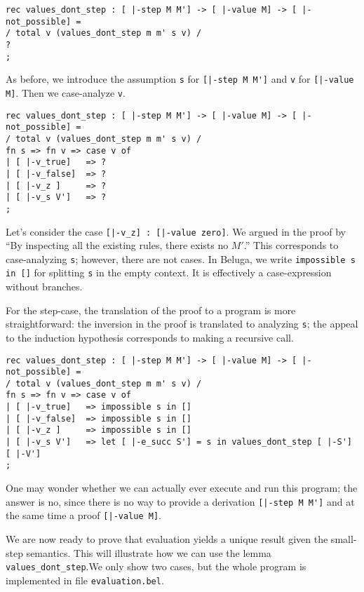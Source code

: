 \begin{lstlisting}
rec values_dont_step : [ |-step M M'] -> [ |-value M] -> [ |-not_possible] =
/ total v (values_dont_step m m' s v) /
?
;
\end{lstlisting}

As before, we introduce the assumption \lstinline!s! for
\lstinline![|-step M M']! and \lstinline!v! for
\lstinline![|-value M]!. Then we case-analyze \lstinline!v!.

\begin{lstlisting}
rec values_dont_step : [ |-step M M'] -> [ |-value M] -> [ |-not_possible] =
/ total v (values_dont_step m m' s v) /
fn s => fn v => case v of
| [ |-v_true]   => ?
| [ |-v_false]  => ?
| [ |-v_z ]     => ?
| [ |-v_s V']   => ?
;
\end{lstlisting}

Let's consider the case \lstinline![|-v_z] : [|-value zero]!. We argued in the
proof by ``By inspecting all the existing rules, there exists no $M'$.'' This
corresponds to case-analyzing \lstinline!s!; however, there are not cases. In
Beluga, we write \lstinline!impossible s in []! for splitting \lstinline!s! in
the empty context. It is effectively a case-expression without branches.

For the step-case, the translation of the proof to a program is more
straightforward: the inversion in the proof is translated to analyzing
\lstinline!s!; the appeal to the induction hypothesis corresponds to making a
recursive call.

\begin{lstlisting}
rec values_dont_step : [ |-step M M'] -> [ |-value M] -> [ |-not_possible] =
/ total v (values_dont_step m m' s v) /
fn s => fn v => case v of
| [ |-v_true]   => impossible s in []
| [ |-v_false]  => impossible s in []
| [ |-v_z ]     => impossible s in []
| [ |-v_s V']   => let [ |-e_succ S'] = s in values_dont_step [ |-S'] [ |-V']
;
\end{lstlisting}

One may wonder whether we can actually ever execute and run this program; the
answer is no, since there is no way to provide a derivation
\lstinline![|-step M M']! and at the same time a proof \lstinline![|-value M]!.


We are now ready to prove that evaluation yields a unique result given the
small-step semantics. This will illustrate how we can use the lemma \lstinline!values_dont_step!.We only show two cases, but the whole program is
implemented in file \lstinline!evaluation.bel!.

